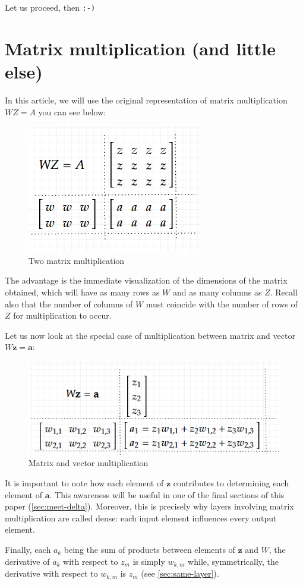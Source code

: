 \documentclass{article}
\begin{document}
Let us proceed, then \verb|:-)|



\section{Matrix multiplication (and little else)}\label{sec:matrix}
In this article, we will use the original representation of matrix multiplication $WZ=A$ you can see below:

\begin{figure}[H]
    \centering
    \includegraphics[width=0.3\linewidth]{images/matrix.png}
    \caption{Two matrix multiplication}
\end{figure}

The advantage is the immediate visualization of the dimensions of the matrix obtained, which will have as many rows as $W$ and as many columns as $Z$. Recall also that the number of columns of $W$ must coincide with the number of rows of $Z$ for multiplication to occur.

Let us now look at the special case of multiplication between matrix and vector $W\boldsymbol{z}=\boldsymbol{a}$:

\begin{figure}[H]
    \centering
    \includegraphics[width=0.5\linewidth]{images/matrix-vector.png}
    \caption{Matrix and vector multiplication}
    \label{fig:enter-label}
\end{figure}

It is important to note how each element of $\boldsymbol{z}$ contributes to determining each element of $\boldsymbol{a}$. This awareness will be useful in one of the final sections of this paper (\ref{sec:meet-delta}). Moreover, this is precisely why layers involving matrix multiplication are called dense: each input element influences every output element.

Finally, each $a_k$ being the sum of products between elements of $\boldsymbol{z}$ and $W$, the derivative of $a_k$ with respect to $z_m$ is simply $w_{k,m}$ while, symmetrically, the derivative with respect to $w_{k,m}$ is $z_m$ (see \ref{sec:same-layer}).
\end{document}
